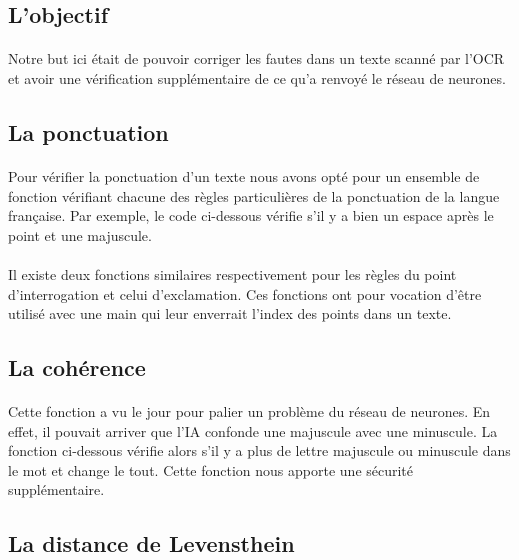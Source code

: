 \documentclass{article}
\begin{document}
\subsection{L'objectif}

\paragraph{}Notre but ici était de pouvoir corriger les fautes dans un texte scanné par l’OCR et avoir une vérification supplémentaire de ce qu’a renvoyé le réseau de neurones.

\subsection{La ponctuation}

\paragraph{}
Pour vérifier la ponctuation d’un texte nous avons opté pour un ensemble de fonction vérifiant chacune des règles particulières de la ponctuation de la langue française. Par exemple, le code ci-dessous vérifie s'il y a bien un espace après le point et une majuscule.

\paragraph{}Il existe deux fonctions similaires respectivement pour les règles du point d’interrogation et celui d’exclamation. Ces fonctions ont pour vocation d'être utilisé avec une main qui leur enverrait l’index des points dans un texte.

\subsection{La cohérence}
\paragraph{}Cette fonction a vu le jour pour palier un problème du réseau de neurones. En effet, il pouvait arriver que l'IA confonde une majuscule avec une minuscule. La fonction ci-dessous vérifie alors s’il y a plus de lettre majuscule ou minuscule dans le mot et change le tout.  Cette fonction nous apporte une sécurité supplémentaire.

\subsection{La distance de Levensthein}
\end{document}
